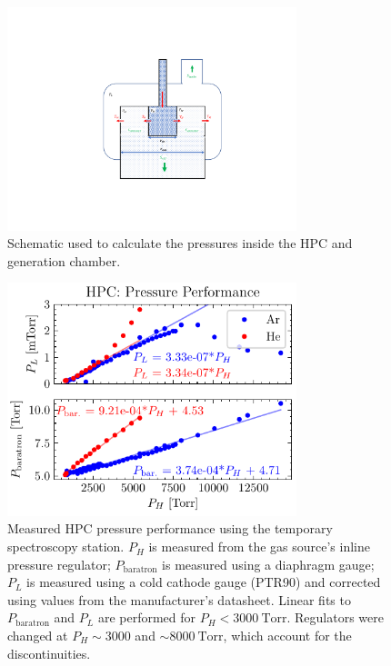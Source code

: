 \begin{figure}
	\centering
	\includegraphics[width=0.75\textwidth]{figures/chap3/HPC_pressure_schematic.pdf}
	\caption{Schematic used to calculate the pressures inside the HPC and generation chamber.}
	\label{fig:HPC_pressure_schematic}
\end{figure}

\begin{figure}
	\centering
	\includegraphics[width=0.75\textwidth]{figures/chap3/HPC_press_performance.pdf}
	\caption{Measured HPC pressure performance using the temporary spectroscopy station. $P_H$ is measured from the gas source's inline pressure regulator; $P_{\textrm{baratron}}$ is measured using a diaphragm gauge; $P_L$ is measured using a cold cathode gauge (PTR90) and corrected using values from the manufacturer's datasheet. Linear fits to $P_{\textrm{baratron}}$ and $P_L$ are performed for  $P_H < 3000 \ \textrm{Torr}$. Regulators were changed at $P_H \sim 3000$ and $\sim 8000 \ \textrm{Torr}$, which account for the discontinuities.}
	\label{fig:HPC_press_performance}
\end{figure}

